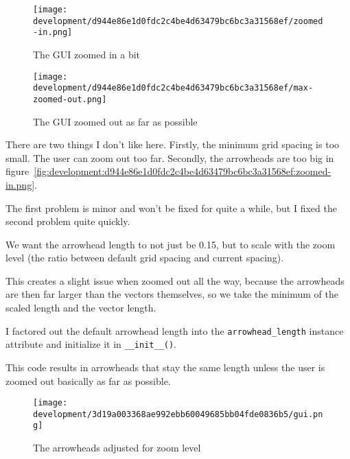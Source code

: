 \documentclass[../main.tex]{subfiles}
\begin{document}
\begin{figure}[H]
	\hspace{0.005\linewidth}
	\centering
	\begin{minipage}{0.48\linewidth}
		\centering
		\texttt{[image: development/d944e86e1d0fdc2c4be4d63479bc6bc3a31568ef/zoomed-in.png]}
		\caption{The GUI zoomed in a bit}
		\label{fig:development:d944e86e1d0fdc2c4be4d63479bc6bc3a31568ef:zoomed-in.png}
	\end{minipage}\hspace{0.015\linewidth}
	\begin{minipage}{0.48\linewidth}
		\centering
		\texttt{[image: development/d944e86e1d0fdc2c4be4d63479bc6bc3a31568ef/max-zoomed-out.png]}
		\caption{The GUI zoomed out as far as possible}
		\label{fig:development:d944e86e1d0fdc2c4be4d63479bc6bc3a31568ef:max-zoomed-out.png}
	\end{minipage}
	\hspace{0.005\linewidth}
	\vspace{-1em}
\end{figure}

There are two things I don't like here. Firstly, the minimum grid spacing is too small. The user can zoom out too far. Secondly, the arrowheads are too big in figure~\ref{fig:development:d944e86e1d0fdc2c4be4d63479bc6bc3a31568ef:zoomed-in.png}.

The first problem is minor and won't be fixed for quite a while, but I fixed the second problem quite quickly.

We want the arrowhead length to not just be 0.15, but to scale with the zoom level (the ratio between default grid spacing and current spacing).

This creates a slight issue when zoomed out all the way, because the arrowheads are then far larger than the vectors themselves, so we take the minimum of the scaled length and the vector length.

I factored out the default arrowhead length into the \texttt{arrowhead\_length} instance attribute and initialize it in \texttt{\_\_init\_\_()}.


This code results in arrowheads that stay the same length unless the user is zoomed out basically as far as possible.

\begin{figure}[H]
	\centering
	\texttt{[image: development/3d19a003368ae992ebb60049685bb04fde0836b5/gui.png]}
	\caption{The arrowheads adjusted for zoom level}
	\label{fig:development:3d19a003368ae992ebb60049685bb04fde0836b5:gui.png}
\end{figure}
\end{document}
